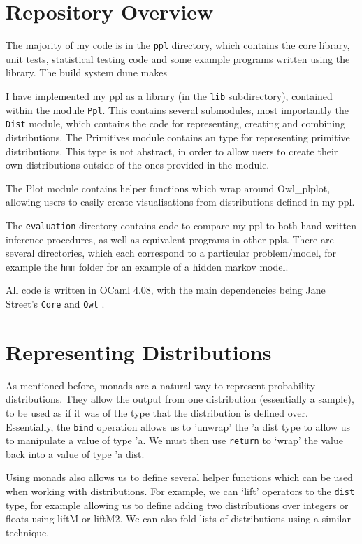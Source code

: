 \section{Repository Overview}

The majority of my code is in the \texttt{ppl} directory, which contains the core library, unit tests, statistical testing code and some example programs written using the library. The build system dune makes 


I have implemented my ppl as a library (in the \texttt{lib} subdirectory), contained within the module \texttt{Ppl}. This contains several submodules, most importantly the \texttt{Dist} module, which contains the code for representing, creating and combining distributions. 
The Primitives module contains an type for representing primitive distributions. This type is not abstract, in order to allow users to create their own distributions outside of the ones provided in the module.

The Plot module contains helper functions which wrap around Owl_plplot, allowing users to easily create visualisations from distributions defined in my ppl.

The \texttt{evaluation} directory contains code to compare my ppl to both hand-written inference procedures, as well as equivalent programs in other ppls. There are several directories, which each correspond to a particular problem/model, for example the \texttt{hmm} folder for an example of a hidden markov model.

All code is written in OCaml 4.08, with the main dependencies being Jane Street's \texttt{Core} and \texttt{Owl} \cite{owl}.

\section{Representing Distributions}

As mentioned before, monads are a natural way to represent probability distributions. They allow the output from one distribution (essentially a sample), to be used as if it was of the type that the distribution is defined over. Essentially, the \texttt{bind} operation allows us to 'unwrap' the 'a dist type to allow us to manipulate a value of type 'a. We must then use \texttt{return} to `wrap' the value back into a value of type 'a dist.

Using monads also allows us to define several helper functions which can be used when working with distributions. For example, we can `lift' operators to the \texttt{dist} type, for example allowing us to define adding two distributions over integers or floats using liftM or liftM2. We can also fold lists of distributions using a similar technique.

